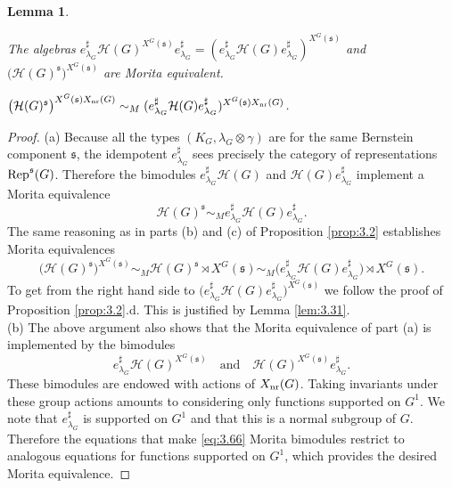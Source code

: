 \documentclass[11pt]{amsart}
\newtheorem{lem}[thm]{Lemma}
\theoremstyle{definition}
\begin{document}
\begin{lem}\label{lem:3.H}
{\begin{enumerate} {{
\item The algebras $e^\sharp_{\lambda_G} {{\mathcal H}} (G)^{X^G ({{\mathfrak s}})} e^\sharp_{\lambda_G} =
( e^\sharp_{\lambda_G} {{\mathcal H}} (G) e^\sharp_{\lambda_G} )^{X^G ({{\mathfrak s}})}$ and \\
$\big( {{\mathcal H}} (G)^{{\mathfrak s}} \big)^{X^G ({{\mathfrak s}})}$ are Morita equivalent. 
\item $\big( {{\mathcal H}} (G)^{{\mathfrak s}} \big)^{X^G ({{\mathfrak s}}) X_{{\rm nr}} (G  )} \sim_M
( e^\sharp_{\lambda_G} {{\mathcal H}} (G) e^\sharp_{\lambda_G} )^{X^G ({{\mathfrak s}}) X_{{\rm nr}} (G  )}$.
}} \end{enumerate}}
\end{lem}
\begin{proof}
(a) Because all the types $(K_G,\lambda_G \otimes \gamma)$
are for the same Bernstein component ${{\mathfrak s}}$, the idempotent $e^\sharp_{\lambda_G}$ sees
precisely the category of representations ${{\rm Rep}}^{{\mathfrak s}} (G)$.
Therefore the bimodules $e^\sharp_{\lambda_G} {{\mathcal H}} (G)$ and
${{\mathcal H}} (G) e^\sharp_{\lambda_G}$ implement a Morita equivalence 
\begin{equation}\label{eq:3.74}
{{\mathcal H}} (G)^{{\mathfrak s}} \sim_M e^\sharp_{\lambda_G} {{\mathcal H}} (G) e^\sharp_{\lambda_G} .
\end{equation}
The same reasoning as in parts (b) and (c) of Proposition \ref{prop:3.2} establishes
Morita equivalences
\[
\big( {{\mathcal H}} (G)^{{\mathfrak s}} \big)^{X^G ({{\mathfrak s}})} \sim_M {{\mathcal H}} (G)^{{\mathfrak s}} \rtimes X^G ({{\mathfrak s}}) \sim_M
\big( e^\sharp_{\lambda_G} {{\mathcal H}} (G) e^\sharp_{\lambda_G} \big) \rtimes X^G ({{\mathfrak s}}) .
\]
To get from the right hand side to $\big( e^\sharp_{\lambda_G} {{\mathcal H}} (G) e^\sharp_{\lambda_G} 
\big)^{X^G ({{\mathfrak s}})}$ we follow the proof of Proposition \ref{prop:3.2}.d. This is
justified by Lemma \ref{lem:3.31}. \\
(b) The above argument also shows that the Morita 
equivalence of part (a) is implemented by the bimodules
\begin{equation}\label{eq:3.66}
e^\sharp_{\lambda_G} {{\mathcal H}} (G)^{X^G ({{\mathfrak s}})} \quad \text{and} \quad
{{\mathcal H}} (G)^{X^G ({{\mathfrak s}})} e^\sharp_{\lambda_G}.
\end{equation}
These bimodules are endowed with actions of $X_{{\rm nr}} (G)$. Taking invariants
under these group actions amounts to considering only functions supported on $G^1$.
We note that $e^\sharp_{\lambda_G}$ is supported on $G^1$ and that this is a normal subgroup
of $G$. Therefore the equations that make \eqref{eq:3.66} Morita bimodules restrict
to analogous equations for functions supported on $G^1$, which provides the desired
Morita equivalence.
\end{proof}
\end{document}
